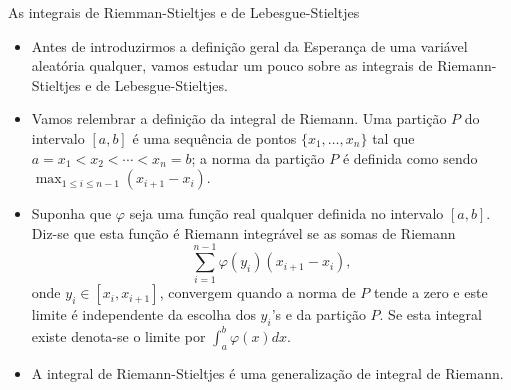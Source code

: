 \begin{frame}
\begin{block}{As integrais de Riemman-Stieltjes e de Lebesgue-Stieltjes}
%
%
\begin{itemize}
\item Antes de introduzirmos a definição geral da Esperança de uma variável aleatória qualquer, vamos estudar um pouco sobre as integrais de Riemann-Stieltjes e de Lebesgue-Stieltjes. \\ 

\item Vamos relembrar a definição da integral de Riemann. Uma partição $P$ do intervalo $[a,b]$ é uma sequência de pontos $\{x_1,\ldots,x_n\}$ tal que $a=x_1<x_2<\cdots<x_{n}=b$; a norma da partição $P$ é definida como sendo $\max_{1\leq i\leq n-1}(x_{i+1}-x_i)$. \\ 

\item Suponha que $\varphi$ seja uma função real qualquer definida no intervalo $[a,b]$. Diz-se que esta função é Riemann integrável se as somas de Riemann
$$\sum_{i=1}^{n-1}\varphi(y_i)(x_{i+1}-x_i),$$
onde $y_i\in[x_i,x_{i+1}]$, convergem quando a norma de $P$ tende a zero e este limite é independente da escolha dos $y_i$'s e da partição $P$. Se esta integral existe denota-se o limite por $\int_{a}^{b}\varphi(x) dx$.

\item A integral de Riemann-Stieltjes é uma generalização de integral de Riemann.
\end{itemize}

\end{block}
\end{frame}
%

